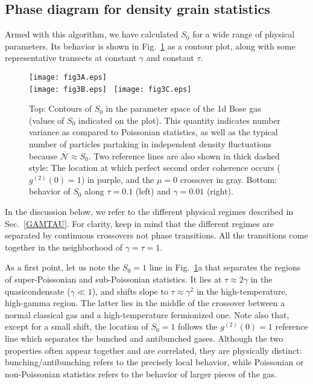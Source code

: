 \documentclass[aps,twocolumn,pra,superscriptaddress,nofootinbib,amsmath,amssymb,floats,floatfix,english]{revtex4-1}
\newcommand{\mc}[1]{{\mathcal{#1}}}
\newcommand{\wb}[1]{{\overline{#1}}}
\begin{document}
\subsection{Phase diagram for density grain statistics}
\label{UGRESULT}

Armed with this algorithm, we have calculated $S_0$ for a wide range of physical parameters. Its behavior is shown in 
Fig.~\ref{fig:uG} as a contour plot, along with some representative transects at constant $\gamma$ and constant $\tau$.

\begin{figure}[h!]
\begin{center}
\texttt{[image: fig3A.eps]}
\\
\texttt{[image: fig3B.eps]}
\
\texttt{[image: fig3C.eps]}
\end{center}
\caption{
Top: Contours of $S_0$ in the parameter space of the 1d Bose gas (values of $S_0$ indicated on the plot).
This quantity indicates number variance as compared to Poissonian statistics, as well as the typical number of particles partaking 
in independent density fluctuations because $\wb{\mc{N}}\approx S_0$. Two reference lines are also shown in thick dashed style: 
The location at which perfect second order coherence occurs ($g^{(2)}(0)=1$) in purple, and the $\mu=0$ crossover in gray.
Bottom: behavior of $S_0$ along $\tau=0.1$ (left) and $\gamma=0.01$ (right). 
}
\label{fig:uG}
\end{figure}



In the discussion below, we refer to the different physical regimes described in Sec.~\ref{GAMTAU}. 
For clarity, keep in mind that the different regimes are separated by continuous crossovers not phase transitions. All the transitions come together in the neighborhood of $\gamma=\tau=1$.

As a first point, let us note the $S_0=1$ line in Fig.~\ref{fig:uG}a that separates the regions of super-Poissonian and sub-Poissonian statistics.  
It lies at $\tau\approx2\gamma$ in the quasicondensate ($\gamma\ll1$), and shifts slope to $\tau\approx\gamma^2$ in the high-temperature, high-gamma region. The latter lies in the middle of the crossover between a normal classical gas and a high-temperature fermionized one. 
Note also that, except for a small shift, the location of $S_0=1$ follows the $g^{(2)}(0)=1$ reference line 
which separates the bunched and antibunched gases. 
Although the two properties often appear together and are correlated, they are physically distinct: 
bunching/antibunching refers to the precisely local behavior, while Poissonian or non-Poissonian statistics refers to the behavior of larger pieces of the gas. 
\end{document}
